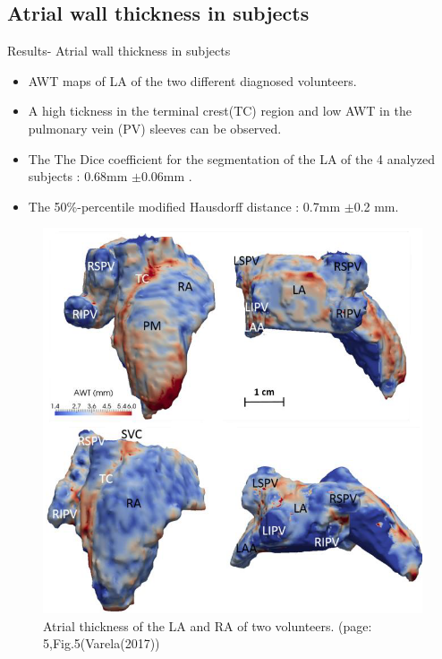 \documentclass[aspectratio=43]{beamer}
\begin{document}
\newpage
\subsection{Atrial wall thickness in subjects}
\begin{frame}{Results- Atrial wall thickness in subjects}
\begin{minipage}{0.6\textwidth}\raggedleft
\begin{itemize}
        \item AWT maps of LA of the two different diagnosed volunteers.
          \item A high tickness in the terminal crest(TC) region and low AWT in the pulmonary vein (PV) sleeves can be observed.
        \item The The Dice coefficient for the segmentation of the LA of the 4 analyzed subjects : 0.68mm \begin{math}\pm \end{math}0.06mm .
        \item The 50\%-percentile modified Hausdorff distance : 0.7mm \begin{math}\pm \end{math}0.2 mm.
        
\end{itemize}
\end{minipage}
\begin{minipage}{0.4\textwidth}\raggedleft
\begin{figure}[h!]


\includegraphics[width=\linewidth]{img/img6}

\caption {Atrial thickness of the LA and RA of two volunteers. (page: 5,Fig.5(Varela(2017)) }
\end{figure}
\end{minipage}

\noindent



\end{frame}
\end{document}
